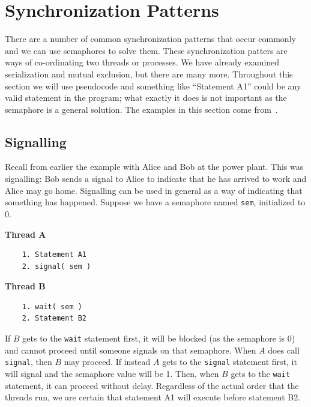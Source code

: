 




\section*{Synchronization Patterns}

There are a number of common synchronization patterns that occur commonly and we can use semaphores to solve them. These synchronization patters are ways of co-ordinating two threads or processes. We have already examined serialization and mutual exclusion, but there are many more. Throughout this section we will use pseudocode and something like ``Statement A1'' could be any valid statement in the program; what exactly it does is not important as the semaphore is a general solution. The examples in this section come from~\cite{lbs}.

\subsection*{Signalling}
Recall from earlier the example with Alice and Bob at the power plant. This was signalling: Bob sends a signal to Alice to indicate that he has arrived to work and Alice may go home. Signalling can be used in general as a way of indicating that something has happened. Suppose we have a semaphore named \texttt{sem}, initialized to 0.

\begin{multicols}{2}
\textbf{Thread A}\vspace{-2em}
  \begin{verbatim}
	1. Statement A1
	2. signal( sem )
  \end{verbatim}
\columnbreak
\textbf{Thread B}\vspace{-2em}
  \begin{verbatim}
	1. wait( sem )
	2. Statement B2
  \end{verbatim}
\end{multicols}
\vspace{-2em}

If $B$ gets to the \texttt{wait} statement first, it will be blocked (as the semaphore is 0) and cannot proceed until someone signals on that semaphore. When $A$ does call \texttt{signal}, then $B$ may proceed. If instead $A$ gets to the \texttt{signal} statement first, it will signal and the semaphore value will be 1. Then, when $B$ gets to the \texttt{wait} statement, it can proceed without delay. Regardless of the actual order that the threads run, we are certain that statement A1 will execute before statement B2.


